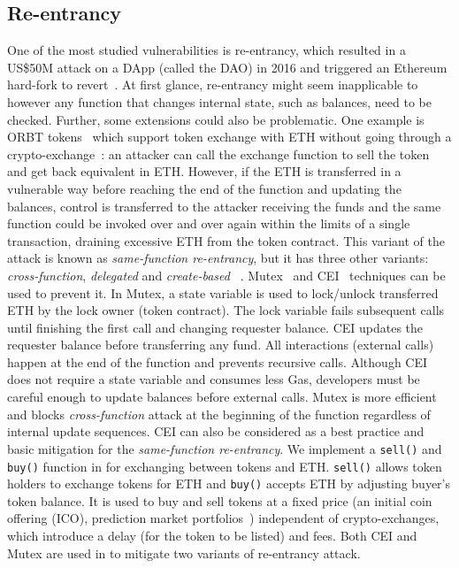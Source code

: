 \subsection{Re-entrancy}\label{subsec:ent}
One of the most studied vulnerabilities is re-entrancy, which resulted in a US\$50M attack on a DApp (called the DAO) in 2016 and triggered an Ethereum hard-fork to revert~\cite{DAO1}. At first glance, re-entrancy might seem inapplicable to \erc however any function that changes internal state, such as balances, need to be checked. Further, some \erc extensions could also be problematic. One example is ORBT tokens~\cite{ORBTToken} which support token exchange with ETH without going through a crypto-exchange~\cite{ORBT}: an attacker can call the exchange function to sell the token and get back equivalent in ETH. However, if the ETH is transferred in a vulnerable way before reaching the end of the function and updating the balances, control is transferred to the attacker receiving the funds and the same function could be invoked over and over again within the limits of a single transaction, draining excessive ETH from the token contract. This variant of the attack is known as \textit{same-function re-entrancy}, but it has three other variants: \textit{cross-function}, \textit{delegated} and \textit{create-based} ~\cite{SEREUM}. Mutex~\cite{WiKiMutex} and CEI~\cite{SolidtyDocSec} techniques can be used to prevent it. In Mutex, a state variable is used to lock/unlock transferred ETH by the lock owner (\ie token contract). The lock variable fails subsequent calls until finishing the first call and changing requester balance. CEI updates the requester balance before transferring any fund. All interactions (\ie external calls) happen at the end of the function and prevents recursive calls. Although CEI does not require a state variable and consumes less Gas, developers must be careful enough to update balances before external calls. Mutex is more efficient and blocks \textit{cross-function} attack at the beginning of the function regardless of internal update sequences. CEI can also be considered as a best practice and basic mitigation for the \textit{same-function re-entrancy}. We implement a \texttt{sell()} and \texttt{buy()} function in \sys for exchanging between tokens and ETH. \texttt{sell()} allows token holders to exchange tokens for ETH and \texttt{buy()} accepts ETH by adjusting buyer's token balance. It is used to buy and sell tokens at a fixed price (\eg an initial coin offering (ICO), prediction market portfolios~\cite{CBN+14}) independent of crypto-exchanges, which introduce a delay (for the token to be listed) and fees. Both CEI and Mutex are used in \sys to mitigate two variants of re-entrancy attack.

